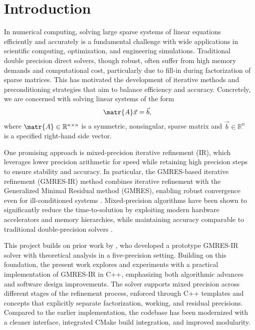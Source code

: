 \chapter{Introduction}
\label{cha:introduction}

In numerical computing, solving large sparse systems of linear equations
efficiently and accurately is a fundamental challenge with wide applications in
scientific computing, optimization, and engineering simulations. Traditional
double precision direct solvers, though robust, often suffer from high memory
demands and computational cost, particularly due to fill-in during factorization
of sparse matrices. This has motivated the development of iterative methods and
preconditioning strategies that aim to balance efficiency and accuracy.
Concretely, we are concerned with solving linear systems of the form \[\matr{A}
  \vec{x} = \vec{b}, \] where \(\matr{A} \in \mathbb{R}^{n \times n}\) is a
symmetric, nonsingular, sparse matrix and \(\vec{b} \in \mathbb{R}^n\) is a
specified right-hand side vector.

One promising approach is mixed-precision iterative refinement (IR), which
leverages lower precision arithmetic for speed while retaining high precision
steps to ensure stability and accuracy. In particular, the GMRES-based iterative
refinement (GMRES-IR) method combines iterative refinement with the Generalized
Minimal Residual method (GMRES), enabling robust convergence even for
ill-conditioned systems \cite{lindquist_improving_2020,mary_mixed_2023}.
Mixed-precision algorithms have been shown to significantly reduce the
time-to-solution by exploiting modern hardware accelerators and memory
hierarchies, while maintaining accuracy comparable to traditional
double-precision solvers \cite{mary_mixed_2023}.

This project builds on prior work by \textcite{wong_exploring_2024}, who developed
a prototype GMRES-IR solver with theoretical analysis in a five-precision
setting. Building on this foundation, the present work explores and experiments
with a practical implementation of GMRES-IR in C++, emphasizing both algorithmic
advances and software design improvements. The solver supports mixed precision
across different stages of the refinement process, enforced through C++
templates and concepts that explicitly separate factorization, working, and
residual precisions. Compared to the earlier implementation, the codebase has
been modernized with a cleaner interface, integrated CMake build integration,
and improved modularity.

